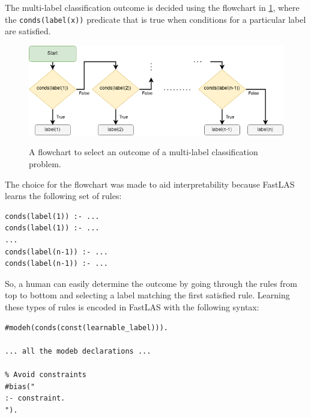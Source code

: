The multi-label classification outcome is decided using the flowchart in \ref{flowchart-multi-label-classification}, where the \verb_conds(label(x))_ predicate that is true when conditions for a particular label are satisfied.

\begin{figure}[h]
\caption{A flowchart to select an outcome of a multi-label classification problem.}
\vspace{10pt}
\centering
\includegraphics[width=\textwidth]{logic-based-classification/multi-label-selection.png}
\label{flowchart-multi-label-classification}
\end{figure}

The choice for the flowchart was made to aid interpretability because FastLAS learns the following set of rules:
\begin{verbatim}
conds(label(1)) :- ...
conds(label(1)) :- ...
...
conds(label(n-1)) :- ...
conds(label(n-1)) :- ...
\end{verbatim}
So, a human can easily determine the outcome by going through the rules from top to bottom and selecting a label matching the first satisfied rule.
Learning these types of rules is encoded in FastLAS with the following syntax:
\begin{verbatim}
#modeh(conds(const(learnable_label))).

... all the modeb declarations ...

% Avoid constraints
#bias("
:- constraint.
").
\end{verbatim}

